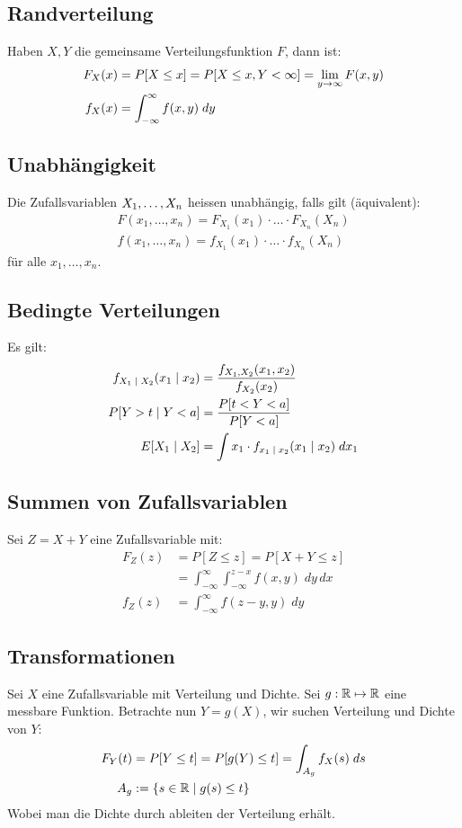 \subsection*{Randverteilung}
Haben $X, Y$ die gemeinsame Verteilungsfunktion $F$, dann ist:
\begin{align*}
  F_X (x) & = P[X \leq x] = P[X \leq x, Y < \infty] = \lim_{y \rightarrow \infty} F (x, y) \\
  f_X (x) & = \int_{-\infty}^\infty f (x, y) \; dy
\end{align*}
\subsection*{Unabhängigkeit}
Die Zufallsvariablen $X_1, \dots, X_n$ heissen unabhängig, falls gilt
(äquivalent):
\begin{align*}
  F (x_1, \dots, x_n) = F_{X_1} (x_1) \cdot \hdots \cdot F_{X_n} (X_n) \\
  f (x_1, \dots, x_n) = f_{X_1} (x_1) \cdot \hdots \cdot f_{X_n} (X_n)
\end{align*}
für alle $x_1, \dots, x_n$.
\subsection*{Bedingte Verteilungen}
Es gilt:
\begin{align*}
  f_{X_1 \; | \; X_2} (x_1 \; | \; x_2) & = \frac{f_{X_1,  X_2} (x_1,  x_2)}{f_{X_2} (x_2)}              \\
  P[Y > t \; | \; Y < a]                   & = \frac{P[t < Y < a]}{P[Y < a]}                                \\
  E[X_1 \; | \; X_2]                    & = \int x_1 \cdot f_{x_1 \; | \; x_2} (x_1 \; | \; x_2) \; dx_1
\end{align*}
\subsection*{Summen von Zufallsvariablen}
Sei $Z = X + Y$ eine Zufallsvariable mit:
\begin{align*}
  F_Z (z) & = P[Z \leq z] = P[X + Y \leq z]                                     \\
          & = \int_{-\infty}^\infty \int_{-\infty}^{z - x} f (x, y )\; dy \, dx \\
  f_Z (z) & = \int_{-\infty}^\infty f (z - y, y) \; dy
\end{align*}
\subsection*{Transformationen}
Sei $X$ eine Zufallsvariable mit Verteilung und Dichte. Sei $g: \mathbb{R} \mapsto \mathbb{R}$
eine messbare Funktion. Betrachte nun $Y = g (X)$, wir suchen Verteilung und
Dichte von $Y$:
\begin{align*}
  F_Y (t) & = P[Y \leq t] = P[g (Y) \leq t] = \int_{A_g} f_X (s) \; ds \\
  A_g     & := \{s \in \mathbb{R} \; | \; g (s) \leq t\}
\end{align*}
Wobei man die Dichte durch ableiten der Verteilung erhält.
